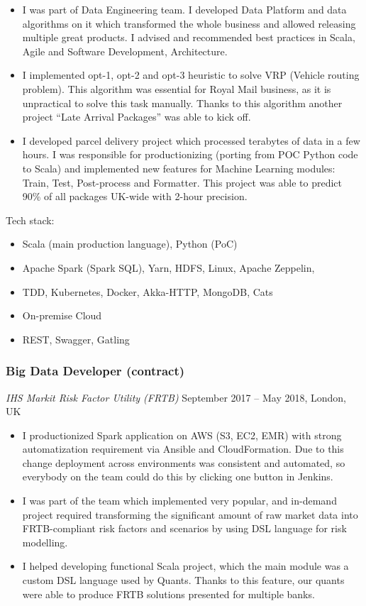 \documentclass[]{rss}
\providecommand{\tightlist}{%
  \setlength{\itemsep}{0pt}\setlength{\parskip}{0pt}}
\begin{document}
\begin{resume}
\begin{itemize}
\item
  I was part of Data Engineering team. I developed Data Platform and
  data algorithms on it which transformed the whole business and allowed
  releasing multiple great products. I advised and recommended best
  practices in Scala, Agile and Software Development, Architecture.
\item
  I implemented opt-1, opt-2 and opt-3 heuristic to solve VRP (Vehicle
  routing problem). This algorithm was essential for Royal Mail
  business, as it is unpractical to solve this task manually. Thanks to
  this algorithm another project ``Late Arrival Packages'' was able to
  kick off.
\item
  I developed parcel delivery project which processed terabytes of data
  in a few hours. I was responsible for productionizing (porting from
  POC Python code to Scala) and implemented new features for Machine
  Learning modules: Train, Test, Post-process and Formatter. This
  project was able to predict 90\% of all packages UK-wide with 2-hour
  precision.
\end{itemize}

Tech stack:

\begin{itemize}
\tightlist
\item
  Scala (main production language), Python (PoC)
\item
  Apache Spark (Spark SQL), Yarn, HDFS, Linux, Apache Zeppelin,
\item
  TDD, Kubernetes, Docker, Akka-HTTP, MongoDB, Cats
\item
  On-premise Cloud
\item
  REST, Swagger, Gatling
\end{itemize}

\hypertarget{big-data-developer-contract}{%
\subsubsection{Big Data Developer
(contract)}\label{big-data-developer-contract}}

\emph{IHS Markit \textbar{} Risk Factor Utility (FRTB)} September 2017
-- May 2018, London, UK

\begin{itemize}
\item
  I productionized Spark application on AWS (S3, EC2, EMR) with strong
  automatization requirement via Ansible and CloudFormation. Due to this
  change deployment across environments was consistent and automated, so
  everybody on the team could do this by clicking one button in Jenkins.
\item
  I was part of the team which implemented very popular, and in-demand
  project required transforming the significant amount of raw market
  data into FRTB-compliant risk factors and scenarios by using DSL
  language for risk modelling.
\item
  I helped developing functional Scala project, which the main module
  was a custom DSL language used by Quants. Thanks to this feature, our
  quants were able to produce FRTB solutions presented for multiple
  banks.
\end{itemize}


\end{resume}
\end{document}
